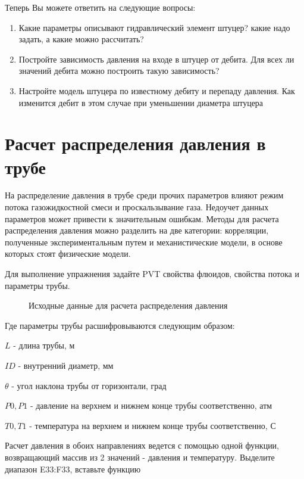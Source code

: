 Теперь Вы можете ответить на следующие вопросы:

\begin{enumerate}
	\item Какие параметры описывают гидравлический элемент штуцер? какие надо задать, а какие можно рассчитать?
	\item Постройте зависимость давления на входе в штуцер от дебита. Для всех ли значений дебита можно построить такую зависимость?
	\item Настройте модель штуцера по известному дебиту и перепаду давления. Как изменится дебит в этом случае при уменьшении диаметра штуцера
\end{enumerate}




\section{Расчет распределения давления в трубе}

На распределение давления в трубе среди прочих параметров влияют режим потока газожидкостной смеси и проскальзывание газа. Недоучет данных параметров может привести к значительным ошибкам. Методы для расчета распределения давления можно разделить на две категории: корреляции, полученные экспериментальным путем и механистические модели, в основе которых стоят физические модели.

Для выполнение упражнения задайте PVT свойства флюидов, свойства потока и параметры трубы.

\begin{figure}[h!]
	\center{\texttt{[image: Ex50\_1]}}
	\caption{Исходные данные для расчета распределения давления}
	\label{ris:Ex50_1}
\end{figure}

Где параметры трубы расшифровываются следующим образом:

$L$ - длина трубы, м

$ID$ - внутренний диаметр, мм

$\theta$ - угол наклона трубы от горизонтали, град

$P0, P1$ - давление на верхнем и нижнем конце трубы соответственно, атм

$T0, T1$  - температура на верхнем и нижнем конце трубы соответственно, С

Расчет давления в обоих направлениях ведется с помощью одной функции, возвращающий массив из 2 значений - давления и температуру. Выделите диапазон E33:F33, вставьте функцию

